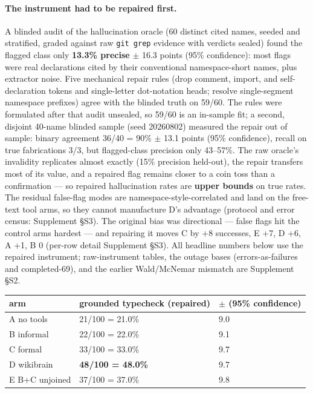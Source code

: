\documentclass[10pt]{article}
\newcommand{\code}[1]{\texttt{#1}}
\newcommand{\best}[1]{\textbf{#1}}
\newcommand{\Ssec}[1]{Supplement \S #1}
\begin{document}
\paragraph{The instrument had to be repaired first.} A blinded audit of
the hallucination oracle (60 distinct cited names, seeded and
stratified, graded against raw \code{git grep} evidence with verdicts
sealed) found the flagged class only \textbf{13.3\% precise}
$\pm$ 16.3 points (95\% confidence): most flags were real declarations
cited by their conventional
namespace-short names, plus extractor noise. Five mechanical repair
rules (drop comment, import, and self-declaration tokens and
single-letter dot-notation heads; resolve single-segment namespace
prefixes) agree with the blinded truth on 59/60. The rules were
formulated after that audit unsealed, so 59/60 is an in-sample fit; a
second, disjoint 40-name blinded sample (seed 20260802) measured the
repair out of sample: binary agreement 36/40 = 90\% $\pm$ 13.1 points
(95\% confidence), recall on
true fabrications 3/3, but flagged-class precision only 43--57\%. The
raw oracle's invalidity replicates almost exactly (15\% precision
held-out), the repair transfers most of its value, and a repaired flag
remains closer to a coin toss than a confirmation --- so repaired
hallucination rates are \textbf{upper bounds} on true rates. The
residual false-flag modes are namespace-style-correlated and land on
the free-text tool arms, so they cannot manufacture D's advantage
(protocol and error census: \Ssec{S3}). The original bias was
directional --- false flags hit the control arms hardest --- and
repairing it moves C by +8 successes, E +7, D +6, A +1, B 0 (per-row
detail \Ssec{S3}). All headline numbers below use the repaired
instrument; raw-instrument tables, the outage bases (errors-as-failures
and completed-69), and the earlier Wald/McNemar mismatch are \Ssec{S2}.

\begin{center}\footnotesize
\begin{tabular}{@{}lll@{}}
\toprule
arm & grounded typecheck (repaired) & $\pm$ (95\% confidence) \\
\midrule
A no tools & 21/100 = 21.0\% & 9.0 \\
B informal & 22/100 = 22.0\% & 9.1 \\
C formal & 33/100 = 33.0\% & 9.7 \\
D wikibrain & \best{48/100 = 48.0\%} & 9.7 \\
E B+C unjoined & 37/100 = 37.0\% & 9.8 \\
\bottomrule
\end{tabular}
\end{center}
\end{document}

